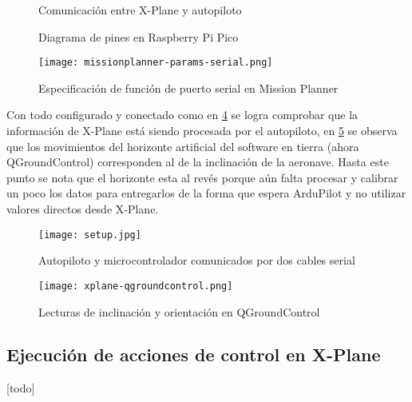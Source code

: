\begin{figure}[h]
    \centering
    
    \caption{Comunicación entre X-Plane y autopiloto}
    \label{fig:plugin}
\end{figure}

\begin{figure}[h]
    \centering
    
    \caption{Diagrama de pines en Raspberry Pi Pico}
    \label{fig:pico-pins}
\end{figure}

\begin{figure}[h]
    \centering
    \texttt{[image: missionplanner-params-serial.png]}
    \caption{Especificación de función de puerto serial en Mission Planner}
    \label{fig:missionplanner-params-serial}
\end{figure}

Con todo configurado y conectado como en \cref{fig:setup} se logra comprobar que la información de X-Plane está siendo procesada por el autopiloto, en \cref{fig:qgroundcontrol} se observa que los movimientos del horizonte artificial del software en tierra (ahora QGroundControl) corresponden al de la inclinación de la aeronave. Hasta este punto se nota que el horizonte esta al revés porque aún falta procesar y calibrar un poco los datos para entregarlos de la forma que espera ArduPilot y no utilizar valores directos desde X-Plane.

\begin{figure}[h]
    \centering
    \texttt{[image: setup.jpg]}
    \caption{Autopiloto y microcontrolador comunicados por dos cables serial}
    \label{fig:setup}
\end{figure}

\begin{figure}[h]
    \centering
    \texttt{[image: xplane-qgroundcontrol.png]}
    \caption{Lecturas de inclinación y orientación en QGroundControl}
    \label{fig:qgroundcontrol}
\end{figure}

\subsection{Ejecución de acciones de control en X-Plane}

[todo]